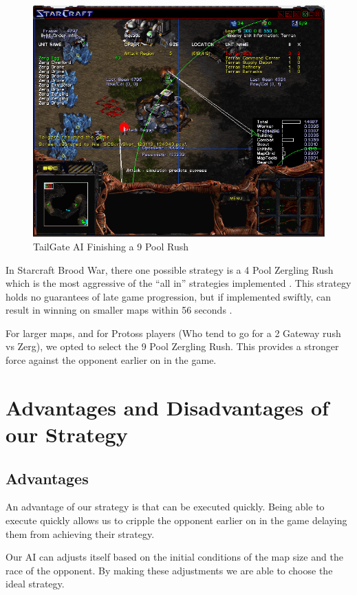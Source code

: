 \documentclass{article}
\begin{document}
\begin{figure}[!ht]
	\includegraphics[width=\textwidth]{images/tailgate_ai.png}
	\caption{TailGate AI Finishing a 9 Pool Rush \cite{9poolvprotoss}}
	\label{fig:9poolrush}
\end{figure}

In Starcraft Brood War, there one possible strategy is a 4 Pool Zergling Rush which is the most aggressive of the ``all in'' strategies implemented \cite{4poolrush}. This strategy holds no guarantees of late game progression, but if implemented swiftly, can result in winning on smaller maps within 56 seconds \cite{9poolvprotoss}.

For larger maps, and for Protoss players (Who tend to go for a 2 Gateway rush vs Zerg), we opted to select the 9 Pool Zergling Rush. This provides a stronger force against the opponent earlier on in the game.

\section{Advantages and Disadvantages of our Strategy}

\subsection{Advantages}
An advantage of our strategy is that can be executed quickly. Being able to execute quickly allows us to cripple the opponent earlier on in the game delaying them from achieving their strategy.

Our AI can adjusts itself based on the initial conditions of the map size and the race of the opponent. By making these adjustments we are able to choose the ideal strategy.
\end{document}
